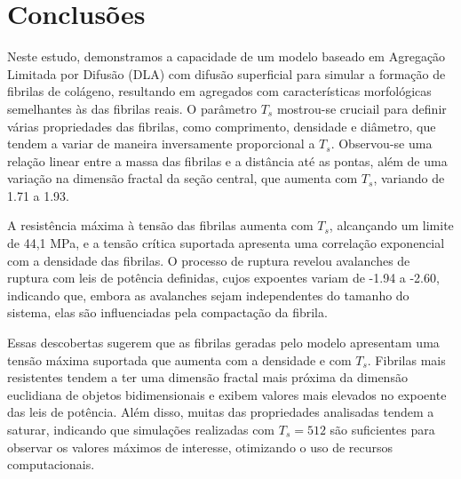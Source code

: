 \documentclass{article}
\begin{document}
\section{Conclusões}

    Neste estudo, demonstramos a capacidade de um modelo baseado em Agregação Limitada por Difusão (DLA) com difusão 
    superficial para simular a formação de fibrilas de colágeno, resultando em agregados com características morfológicas 
    semelhantes às das fibrilas reais. O parâmetro \(T_{s}\) mostrou-se cruciail para definir várias propriedades das 
    fibrilas, como comprimento, densidade e diâmetro, que tendem a variar de maneira inversamente proporcional a \(T_{s}\). 
    Observou-se uma relação linear entre a massa das fibrilas e a distância até as pontas, além de uma variação na dimensão 
    fractal da seção central, que aumenta com \(T_{s}\), variando de 1.71 a 1.93.

    A resistência máxima à tensão das fibrilas aumenta com \(T_{s}\), alcançando um limite de 44,1 MPa, e a tensão crítica 
    suportada apresenta uma correlação exponencial com a densidade das fibrilas. O processo de ruptura revelou avalanches 
    de ruptura com leis de potência definidas, cujos expoentes variam de -1.94 a -2.60, indicando que, embora as avalanches 
    sejam independentes do tamanho do sistema, elas são influenciadas pela compactação da fibrila.

    Essas descobertas sugerem que as fibrilas geradas pelo modelo apresentam uma tensão máxima suportada que aumenta com a 
    densidade e com \(T_{s}\). Fibrilas mais resistentes tendem a ter uma dimensão fractal mais próxima da dimensão 
    euclidiana de objetos bidimensionais e exibem valores mais elevados no expoente das leis de potência. Além disso, muitas 
    das propriedades analisadas tendem a saturar, indicando que simulações realizadas com \(T_{s} = 512\) são suficientes para 
    observar os valores máximos de interesse, otimizando o uso de recursos computacionais.




    
\end{document}
